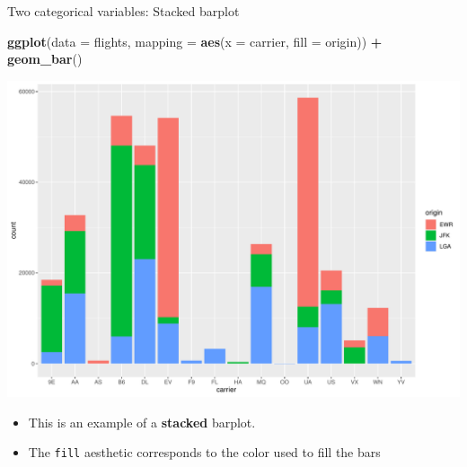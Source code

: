 \documentclass[
  ignorenonframetext,
]{beamer}
\newenvironment{Shaded}{\begin{snugshade}}{\end{snugshade}}
\newcommand{\AttributeTok}[1]{\textcolor[rgb]{0.13,0.29,0.53}{#1}}
\newcommand{\FunctionTok}[1]{\textcolor[rgb]{0.13,0.29,0.53}{\textbf{#1}}}
\newcommand{\NormalTok}[1]{#1}
\newcommand{\SpecialCharTok}[1]{\textcolor[rgb]{0.81,0.36,0.00}{\textbf{#1}}}
\providecommand{\tightlist}{%
  \setlength{\itemsep}{0pt}\setlength{\parskip}{0pt}}
\begin{document}
\begin{frame}[fragile]{Two categorical variables: Stacked barplot}
\protect\hypertarget{two-categorical-variables-stacked-barplot}{}
\tiny

\begin{Shaded}
\begin{Highlighting}[]
\FunctionTok{ggplot}\NormalTok{(}\AttributeTok{data =}\NormalTok{ flights, }\AttributeTok{mapping =} \FunctionTok{aes}\NormalTok{(}\AttributeTok{x =}\NormalTok{ carrier, }\AttributeTok{fill =}\NormalTok{ origin)) }\SpecialCharTok{+}
  \FunctionTok{geom\_bar}\NormalTok{()}
\end{Highlighting}
\end{Shaded}

\begin{center}\includegraphics[width=0.9\linewidth,height=0.5\textheight]{Week2_Lect_files/figure-beamer/unnamed-chunk-42-1} \end{center}
\normalsize

\begin{itemize}
\tightlist
\item
  This is an example of a \textbf{stacked} barplot.
\item
  The \texttt{fill} aesthetic corresponds to the color used to fill the
  bars
\end{itemize}
\end{frame}
\end{document}
